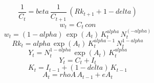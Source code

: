 \begin{dmath}
\frac{1}{{C}_{t}}={beta}\, \frac{1}{{C}_{t+1}}\, \left({Rk}_{t+1}+1-{delta}\right)
\end{dmath}
\begin{dmath}
{w}_{t}={C}_{t}\, {con}
\end{dmath}
\begin{dmath}
{w}_{t}=\left(1-{alpha}\right)\, \exp\left({A}_{t}\right)\, {K}_{t}^{{alpha}}\, {N}_{t}^{\left(-{alpha}\right)}
\end{dmath}
\begin{dmath}
{Rk}_{t}={alpha}\, \exp\left({A}_{t}\right)\, {K}_{t}^{{alpha}-1}\, {N}_{t}^{1-{alpha}}
\end{dmath}
\begin{dmath}
{Y}_{t}={N}_{t}^{1-{alpha}}\, \exp\left({A}_{t}\right)\, {K}_{t}^{{alpha}}
\end{dmath}
\begin{dmath}
{Y}_{t}={C}_{t}+{I}_{t}
\end{dmath}
\begin{dmath}
{K}_{t}={I}_{t-1}+\left(1-{delta}\right)\, {K}_{t-1}
\end{dmath}
\begin{dmath}
{A}_{t}={rhoA}\, {A}_{t-1}+{eA}_{t}
\end{dmath}
